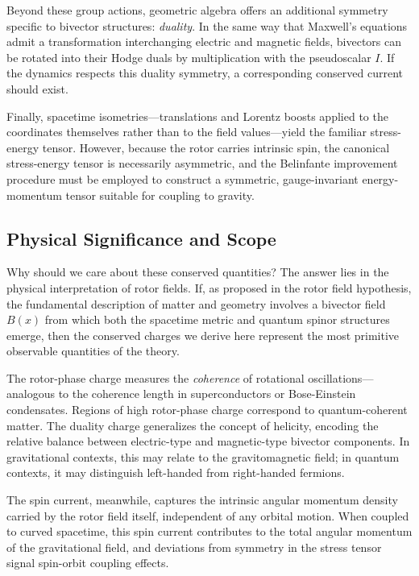 \documentclass[11pt,a4paper]{article}
\numberwithin{equation}{section}
\theoremstyle{plain}
\theoremstyle{definition}
\theoremstyle{remark}
\begin{document}
Beyond these group actions, geometric algebra offers an additional symmetry specific to bivector structures: \emph{duality}. In the same way that Maxwell's equations admit a transformation interchanging electric and magnetic fields, bivectors can be rotated into their Hodge duals by multiplication with the pseudoscalar $I$. If the dynamics respects this duality symmetry, a corresponding conserved current should exist.

Finally, spacetime isometries---translations and Lorentz boosts applied to the coordinates themselves rather than to the field values---yield the familiar stress-energy tensor. However, because the rotor carries intrinsic spin, the canonical stress-energy tensor is necessarily asymmetric, and the Belinfante improvement procedure must be employed to construct a symmetric, gauge-invariant energy-momentum tensor suitable for coupling to gravity.

\subsection{Physical Significance and Scope}

Why should we care about these conserved quantities? The answer lies in the physical interpretation of rotor fields. If, as proposed in the rotor field hypothesis, the fundamental description of matter and geometry involves a bivector field $B(x)$ from which both the spacetime metric and quantum spinor structures emerge, then the conserved charges we derive here represent the most primitive observable quantities of the theory.

The rotor-phase charge measures the \emph{coherence} of rotational oscillations---analogous to the coherence length in superconductors or Bose-Einstein condensates. Regions of high rotor-phase charge correspond to quantum-coherent matter. The duality charge generalizes the concept of helicity, encoding the relative balance between electric-type and magnetic-type bivector components. In gravitational contexts, this may relate to the gravitomagnetic field; in quantum contexts, it may distinguish left-handed from right-handed fermions.

The spin current, meanwhile, captures the intrinsic angular momentum density carried by the rotor field itself, independent of any orbital motion. When coupled to curved spacetime, this spin current contributes to the total angular momentum of the gravitational field, and deviations from symmetry in the stress tensor signal spin-orbit coupling effects.
\end{document}
